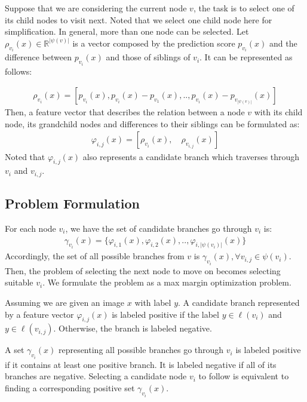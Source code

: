 \documentclass[review]{elsarticle}
\begin{document}
Suppose that we are considering the current node $v$, the task is to select one of its child nodes to visit next. Noted that we select one child node here for simplification. In general, more than one node can be selected. Let $\rho_{v_i}(x) \in \mathbb{R}^{|\psi(v)|}$ is a vector composed by the prediction score $p_{v_i}(x)$ and the difference between $p_{v_i}(x)$ and those of siblings of $v_i$. It can be represented as follows:


\begin{multline}
\rho_{v_i}(x) = [p_{v_i}(x), p_{v_i}(x)-p_{v_1}(x), .. , p_{v_i}(x) - p_{v_{|\psi(v)|}}(x)] 
\end{multline}
Then, a feature vector that describes the relation between a node $v$ with its child node, its grandchild nodes and differences to their siblings can be formulated as:
\begin{align}
\varphi_{i,j}(x) = [ \rho_{v_i}(x) , \quad  \rho_{v_{i,j}}(x) ]
\end{align}
Noted that $\varphi_{i,j}(x)$ also represents a candidate branch which traverses through $v_i$ and $v_{i,j}$.


\subsection{Problem Formulation} \label{sec:formulation}

For each node $v_i$, we have the set of candidate branches go through $v_i$ is:
\begin{align}
 \gamma_{v_i}(x) = \{\varphi_{i,1}(x), \varphi_{i,2}(x), .., \varphi_{i,|\psi(v_i)|}(x) \}
\end{align}
Accordingly, the set of all possible branches from $v$ is $\gamma_{v_i}(x),\forall v_{i,j} \in \psi(v_i)$.
Then, the problem of selecting the next node to move on becomes selecting suitable $v_{i}$. We formulate the problem as a max margin optimization problem.

Assuming we are given an image $x$ with label $y$. A candidate branch represented by a feature vector $\varphi_{i,j}(x)$ is labeled positive if the label $y \in \ell(v_i)$ and $y \in \ell(v_{i,j})$. Otherwise, the branch is labeled negative.

A set $\gamma_{v_i}(x)$ representing all possible branches go through $v_i$ is labeled positive if it contains at least one positive branch. It is labeled negative if all of its branches are negative. Selecting a candidate node $v_i$ to follow is equivalent to finding a corresponding positive set $\gamma_{v_i}(x)$.  
\end{document}
